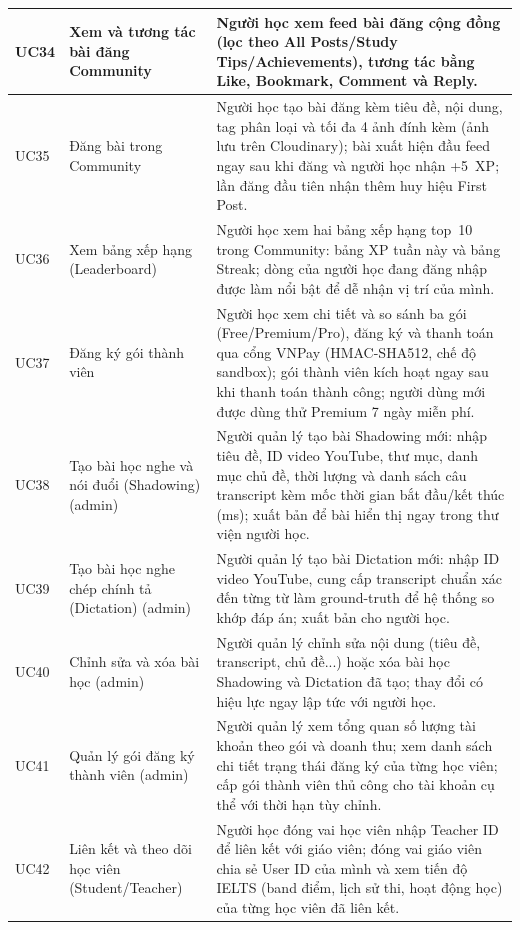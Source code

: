 \begin{longtable}{|p{15\tbu}|p{45\tbu}|p{90\tbu}|}
    UC34 & Xem và tương tác bài đăng Community & Người học xem feed bài đăng cộng đồng (lọc theo All Posts/Study Tips/Achievements), tương tác bằng Like, Bookmark, Comment và Reply. \\ \hline
    UC35 & Đăng bài trong Community & Người học tạo bài đăng kèm tiêu đề, nội dung, tag phân loại và tối đa 4 ảnh đính kèm (ảnh lưu trên Cloudinary); bài xuất hiện đầu feed ngay sau khi đăng và người học nhận +5~XP; lần đăng đầu tiên nhận thêm huy hiệu First Post. \\ \hline
    UC36 & Xem bảng xếp hạng (Leaderboard) & Người học xem hai bảng xếp hạng top~10 trong Community: bảng XP tuần này và bảng Streak; dòng của người học đang đăng nhập được làm nổi bật để dễ nhận vị trí của mình. \\ \hline
    UC37 & Đăng ký gói thành viên & Người học xem chi tiết và so sánh ba gói (Free/Premium/Pro), đăng ký và thanh toán qua cổng VNPay (HMAC-SHA512, chế độ sandbox); gói thành viên kích hoạt ngay sau khi thanh toán thành công; người dùng mới được dùng thử Premium 7 ngày miễn phí. \\ \hline
    UC38 & Tạo bài học nghe và nói đuổi (Shadowing) (admin) & Người quản lý tạo bài Shadowing mới: nhập tiêu đề, ID video YouTube, thư mục, danh mục chủ đề, thời lượng và danh sách câu transcript kèm mốc thời gian bắt đầu/kết thúc (ms); xuất bản để bài hiển thị ngay trong thư viện người học. \\ \hline
    UC39 & Tạo bài học nghe chép chính tả (Dictation) (admin) & Người quản lý tạo bài Dictation mới: nhập ID video YouTube, cung cấp transcript chuẩn xác đến từng từ làm ground-truth để hệ thống so khớp đáp án; xuất bản cho người học. \\ \hline
    UC40 & Chỉnh sửa và xóa bài học (admin) & Người quản lý chỉnh sửa nội dung (tiêu đề, transcript, chủ đề...) hoặc xóa bài học Shadowing và Dictation đã tạo; thay đổi có hiệu lực ngay lập tức với người học. \\ \hline
    UC41 & Quản lý gói đăng ký thành viên (admin) & Người quản lý xem tổng quan số lượng tài khoản theo gói và doanh thu; xem danh sách chi tiết trạng thái đăng ký của từng học viên; cấp gói thành viên thủ công cho tài khoản cụ thể với thời hạn tùy chỉnh. \\ \hline
    UC42 & Liên kết và theo dõi học viên (Student/Teacher) & Người học đóng vai học viên nhập Teacher ID để liên kết với giáo viên; đóng vai giáo viên chia sẻ User ID của mình và xem tiến độ IELTS (band điểm, lịch sử thi, hoạt động học) của từng học viên đã liên kết. \\ \hline
\end{longtable}

